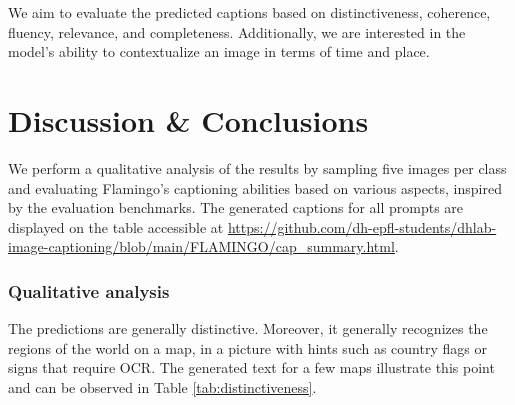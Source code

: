 We aim to evaluate the predicted captions based on distinctiveness, coherence, fluency, relevance, and completeness. Additionally, we are interested in the model's ability to contextualize an image in terms of time and place.



\section{Discussion \& Conclusions}

We perform a qualitative analysis of the results by sampling five images per class and evaluating Flamingo's captioning abilities based on various aspects, inspired by the \cite{fu2023mme} evaluation benchmarks. The generated captions for all prompts are displayed on the table accessible at \url{https://github.com/dh-epfl-students/dhlab-image-captioning/blob/main/FLAMINGO/cap_summary.html}. 

\subsubsection{Qualitative analysis}


The predictions are generally distinctive. Moreover, it generally recognizes the regions of the world on a map, in a picture with hints such as country flags or signs that require OCR. The generated text for a few maps illustrate this point and can be observed in Table \ref{tab:distinctiveness}.

